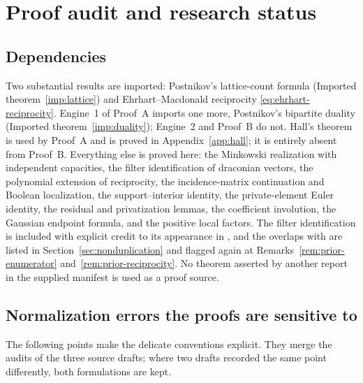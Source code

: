 \documentclass[11pt]{article}
\numberwithin{equation}{section}
\theoremstyle{definition}
\theoremstyle{remark}
\begin{document}
\section{Proof audit and research status}
\label{sec:audit}

\subsection{Dependencies}

Two substantial results are imported: Postnikov's lattice-count formula
(Imported theorem~\ref{imp:lattice}) and Ehrhart--Macdonald reciprocity
\eqref{eq:ehrhart-reciprocity}. Engine~1 of Proof~A imports one more,
Postnikov's bipartite duality (Imported theorem~\ref{imp:duality}); Engine~2
and Proof~B do not. Hall's theorem is used by Proof~A and is proved in
Appendix~\ref{app:hall}; it is entirely absent from Proof~B. Everything else
is proved here: the Minkowski realization with independent capacities, the
filter identification of draconian vectors, the polynomial extension of
reciprocity, the incidence-matrix continuation and Boolean localization, the
support--interior identity, the private-element Euler identity, the residual
and privatization lemmas, the coefficient involution, the Gaussian endpoint
formula, and the positive local factors. The filter identification is included
with explicit credit to its appearance in \cite[Lemma~4.1]{AC}, and the
overlaps with \cite{PriorReciprocity} are listed in
Section~\ref{sec:nonduplication} and flagged again at
Remarks~\ref{rem:prior-enumerator} and~\ref{rem:prior-reciprocity}. No theorem
asserted by another report in the supplied manifest is used as a proof source.

\subsection{Normalization errors the proofs are sensitive to}

The following points make the delicate conventions explicit. They merge the
audits of the three source drafts; where two drafts recorded the same point
differently, both formulations are kept.
\end{document}
